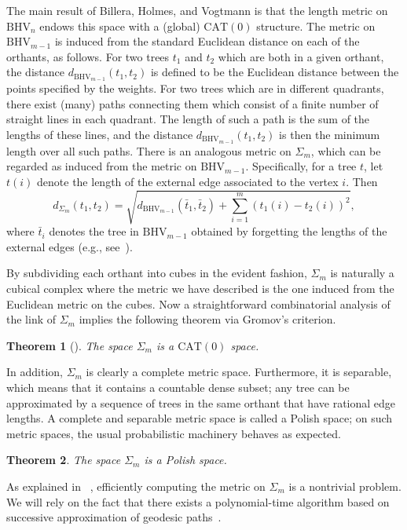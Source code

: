 \documentclass[a4paper,11pt]{article}
\newtheorem{theorem}{Theorem}
\newcommand{\CAT}{\textrm{CAT}}
\newcommand{\BHV}{\textrm{BHV}}
\begin{document}
The main result of Billera, Holmes, and Vogtmann is that the length metric on $\BHV_n$ endows this space with a (global) $\CAT(0)$ structure.
The metric on $\BHV_{m-1}$ is induced from the standard Euclidean distance on each of the orthants, as follows.
For two trees $t_1$ and $t_2$ which are both in a given orthant, the distance $d_{\BHV_{m-1}}(t_1,t_2)$ is defined to be the Euclidean distance between the points specified by the weights.
For two trees which are in different quadrants, there exist (many) paths connecting them which consist of a finite number of straight lines in each quadrant.
The length of such a path is the sum of the lengths of these lines, and the distance $d_{\BHV_{m-1}}(t_1,t_2)$ is then the minimum length over all such paths.
There is an analogous metric on $\Sigma_m$, which can be regarded as induced from the metric on $\BHV_{m-1}$.
Specifically, for a tree $t$, let $t(i)$ denote the length of the external edge associated to the vertex $i$.
Then \[d_{\Sigma_m}(t_1,t_2) = \sqrt{d_{\BHV_{m-1}}(\bar{t}_1,\bar{t}_2) + \sum_{i=1}^m (t_1(i) - t_2(i))^2},\] where $\bar{t}_i$ denotes the tree in $\BHV_{m-1}$ obtained by forgetting the lengths of the external edges (e.g., see~\cite{owen2011fast}).

By subdividing each orthant into cubes in the evident fashion, $\Sigma_m$ is naturally a cubical complex where the metric we have described is the one induced from the Euclidean metric on the cubes.
Now a straightforward combinatorial analysis of the link of $\Sigma_m$ implies the following theorem via Gromov's criterion.

\begin{theorem}[{\cite[4.1]{billera2001geometry}}]
The space $\Sigma_m$ is a $\CAT(0)$ space.
\end{theorem}

In addition, $\Sigma_m$ is clearly a complete metric space.
Furthermore, it is separable, which means that it contains a countable dense subset; any tree can be approximated by a sequence of trees in the same orthant that have rational edge lengths.
A complete and separable metric space is called a Polish space; on such metric spaces, the usual probabilistic machinery behaves as expected.

\begin{theorem}
The space $\Sigma_m$ is a Polish space.
\end{theorem}

As explained in ~\cite[\S4.2]{billera2001geometry}, efficiently computing the metric on $\Sigma_m$ is a nontrivial problem.
We will rely on the fact that there exists a polynomial-time algorithm based on successive approximation of geodesic paths~\cite{owen2011fast}.
\end{document}
